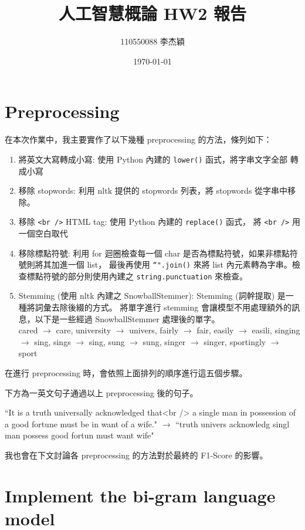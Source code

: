 \documentclass{article}[12pt]
\title{人工智慧概論 HW2 報告}
\author{110550088 李杰穎}
\date{\today}
\begin{document}
\maketitle

\section{Preprocessing}
在本次作業中，我主要實作了以下幾種 preprocessing 的方法，條列如下：
\begin{enumerate}
    \item 將英文大寫轉成小寫: 使用 Python 內建的 \texttt{lower()} 函式，將字串文字全部
    轉成小寫
    \item 移除 stopwords: 利用 nltk 提供的 stopwords 列表，將 stopwords 從字串中移除。
    \item 移除 \texttt{<br />} HTML tag: 使用 Python 內建的 \texttt{replace()} 函式，
    將 \texttt{<br />} 用一個空白取代
    \item 移除標點符號: 利用 for 迴圈檢查每一個 char 是否為標點符號，如果非標點符號則將其加進一個 list，
    最後再使用 \texttt{``".join()} 來將 list 內元素轉為字串。檢查標點符號的部分則使用內建之
    \texttt{string.punctuation} 來檢查。
    \item Stemming (使用 nltk 內建之 SnowballStemmer): Stemming (詞幹提取) 是一種將詞彙去除後綴的方式。
    將單字進行 stemming 會讓模型不用處理額外的訊息，以下是一些經過 SnowballStemmer 處理後的單字。\\
    cared $\rightarrow$         care, 
    university $\rightarrow$     univers, 
    fairly $\rightarrow$         fair, 
    easily $\rightarrow$         easili,
    singing $\rightarrow$       sing, 
    sings $\rightarrow$         sing,  
    sung  $\rightarrow$          sung,  
    singer $\rightarrow$        singer,  
    sportingly $\rightarrow$     sport
\end{enumerate}

在進行 preprocessing 時，會依照上面排列的順序進行這五個步驟。

下方為一英文句子通過以上 preprocessing 後的句子。

``It is a truth universally acknowledged that<br /> 
a single man in possession of a good fortune must be in want of a wife." $\rightarrow$
``truth univers acknowledg singl man possess good fortun must want wife"

我也會在下文討論各 preprocessing 的方法對於最終的 F1-Score 的影響。

\section{Implement the bi-gram language model}
\end{document}
